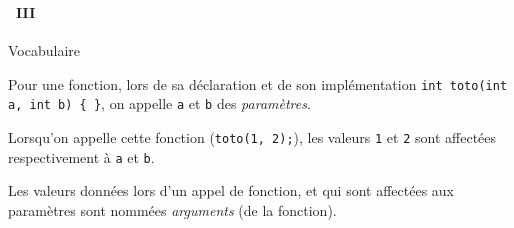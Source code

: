 \begin{frame}[containsverbatim]
  \frametitle{\secname}
  \framesubtitle{\subsecname~III}

  \begin{block}{Vocabulaire}
    \par
    Pour une fonction, lors de sa déclaration et de son implémentation \verb|int toto(int a, int b) { }|, on appelle \verb|a| et \verb|b| des \emph{paramètres}.
    \vspace{0.5cm}
    \par
    Lorsqu'on appelle cette fonction (\verb|toto(1, 2);|), les valeurs \verb|1| et \verb|2| sont affectées respectivement à \verb|a| et \verb|b|.
    \vspace{0.5cm}
    \par
    Les valeurs données lors d'un appel de fonction, et qui sont affectées aux paramètres sont nommées \emph{arguments} (de la fonction).
  \end{block}
\end{frame}

